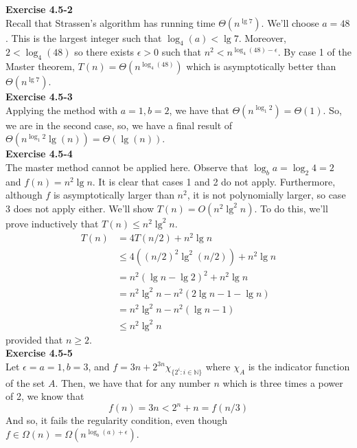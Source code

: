 \documentclass{article}
\begin{document}
\noindent\textbf{Exercise 4.5-2}\\

Recall that Strassen's algorithm has running time $\Theta(n^{\lg 7})$.  We'll choose $a = 48$.  This is the largest integer such that $\log_4(a) < \lg 7$.  Moreover, $2 < \log_4(48)$ so there exists $\epsilon > 0$ such that $n^2 < n^{\log_4(48) - \epsilon}$.  By case 1 of the Master theorem, $T(n) = \Theta(n^{\log_4(48)})$ which is asymptotically better than $\Theta(n^{\lg 7})$. \\

\noindent\textbf{Exercise 4.5-3}\\

Applying the method with $a=1,b=2$, we have that $\Theta(n^{\log_1 2}) = \Theta(1)$. So, we are in the second case, so, we have a final result of $\Theta(n^{\log_1 2}\lg(n)) = \Theta(\lg(n))$.\\

\noindent\textbf{Exercise 4.5-4}\\

The master method cannot be applied here.  Observe that $\log_b a = \log_2 4 = 2$ and $f(n) = n^2 \lg n$.  It is clear that cases 1 and 2 do not apply.  Furthermore, although $f$ is asymptotically larger than $n^2$, it is not polynomially larger, so case 3 does not apply either.  We'll show $T(n) = O(n^2\lg^2 n)$.  To do this, we'll prove inductively that $T(n) \leq n^2\lg^2 n$.  
\begin{align*}
T(n) & = 4T(n/2)+n^2\lg n \\
& \leq 4((n/2)^2\lg^2(n/2)) + n^2 \lg n \\
&= n^2(\lg n - \lg 2)^2 + n^2 \lg n \\
&= n^2\lg^2 n - n^2(2\lg n - 1 - \lg n) \\
&= n^2\lg^2 n - n^2(\lg n - 1) \\
&\leq n^2\lg^2 n
\end{align*}
provided that $n \geq 2$.  \\

\noindent\textbf{Exercise 4.5-5}\\

Let $\epsilon = a=1,b=3$, and $f = 3n + 2^{3n} \chi_{\{2^i:i\in\mathbb{N}\}}$ where $\chi_A$ is the indicator function of the set $A$. Then, we have that for any number $n$ which is three times a power of 2, we know that 
\[
f(n) = 3n < 2^n + n = f(n/3)
\]
And so, it fails the regularity condition, even though $f \in \Omega(n) =\Omega(n^{\log_b(a) + \epsilon})$.\\
\end{document}
